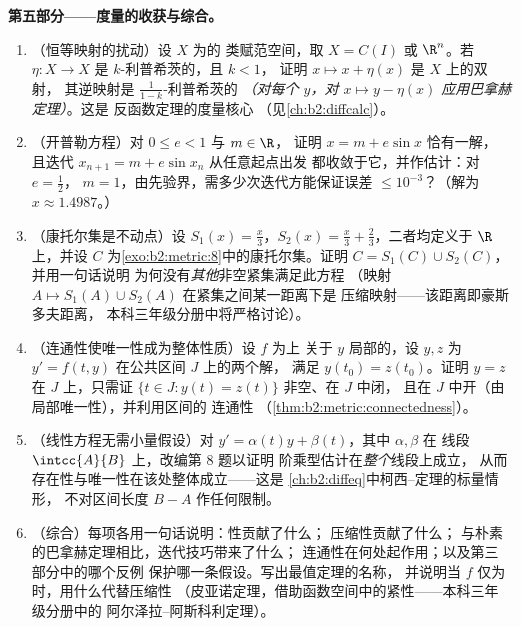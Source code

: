 \begin{problem}
\medskip
\noindent\textbf{第五部分——度量的收获与综合。}
\begin{enumerate}[resume]
  \item （恒等映射的扰动）设 $X$ 为的
        类赋范空间，取 $X = C(I)$ 或 $\R^n$。若
        $\eta \colon X \to X$ 是 $k$-利普希茨的，且 $k < 1$，
        证明 $x \mapsto x + \eta(x)$ 是 $X$ 上的双射，
        其逆映射是 $\frac1{1-k}$-利普希茨的 \emph{（对每个
        $y$，对 $x \mapsto y - \eta(x)$ 应用巴拿赫定理）}。这是
        反函数定理的度量核心
        （见\cref{ch:b2:diffcalc}）。
  \item （开普勒方程）对 $0 \leq e < 1$ 与 $m \in \R$，
        证明 $x = m + e\sin x$ 恰有一解，
        且迭代 $x_{n+1} = m + e\sin x_n$ 从任意起点出发
        都收敛于它，并作估计：对 $e = \frac12$，
        $m = 1$，由先验界，需多少次迭代方能保证误差 $\leq
        10^{-3}$？（解为 $x
        \approx 1.4987$。）
  \item （康托尔集是不动点）设 $S_1(x) = \frac
        x3$，$S_2(x) = \frac x3 + \frac23$，二者均定义于 $\R$ 上，并设
        $C$ 为\cref{exo:b2:metric:8}中的康托尔集。证明
        $C = S_1(C) \cup S_2(C)$，并用一句话说明
        为何没有\emph{其他}非空紧集满足此方程
        （映射 $A \mapsto S_1(A) \cup S_2(A)$ 在紧集之间某一距离下是
        压缩映射——该距离即豪斯多夫距离，
        本科三年级分册中将严格讨论）。
  \item （连通性使唯一性成为整体性质）设 $f$ 为上
        关于 $y$ 局部的，设 $y, z$ 为
        $y' = f(t, y)$ 在公共区间 $J$ 上的两个解，
        满足 $y(t_0) = z(t_0)$。证明 $y = z$ 在 $J$ 上，只需证
        $\{t \in J : y(t) = z(t)\}$ 非空、在 $J$ 中闭，
        且在 $J$ 中开（由局部唯一性），并利用区间的
        连通性
        （\cref{thm:b2:metric:connectedness}）。
  \item （线性方程无需小量假设）对 $y' =
        \alpha(t)y + \beta(t)$，其中 $\alpha, \beta$ 在
        线段 $\intcc{A}{B}$ 上，改编第 8 题以证明
        阶乘型估计在\emph{整个}线段上成立，
        从而存在性与唯一性在该处整体成立——这是
        \cref{ch:b2:diffeq}中柯西–定理的标量情形，
        不对区间长度 $B - A$ 作任何限制。
  \item （综合）每项各用一句话说明：性贡献了什么；
        压缩性贡献了什么；
        与朴素的巴拿赫定理相比，迭代技巧带来了什么；
        连通性在何处起作用；以及第三部分中的哪个反例
        保护哪一条假设。写出最值定理的名称，
        并说明当 $f$ 仅为时，用什么代替压缩性
        （皮亚诺定理，借助函数空间中的紧性——本科三年级分册中的
        阿尔泽拉–阿斯科利定理）。
\end{enumerate}
\end{problem}
